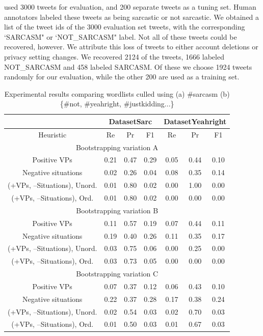 \documentclass[11pt]{article}
\begin{document}
\cite{riloff2013sarcasm} used 3000 tweets for evaluation, and 200 separate tweets as a tuning set. Human annotators labeled these tweets as being sarcastic or not sarcastic. We obtained a list of the tweet ids of the 3000 evaluation set tweets, with the corresponding `SARCASM" or `NOT\_SARCASM" label. Not all of these tweets could be recovered, however. We attribute this loss of tweets to either account deletions or privacy setting changes. We recovered 2124 of the tweets, 1666 labeled NOT\_SARCASM and 458 labeled SARCASM. Of these we choose 1924 tweets randomly for our evaluation, while the other 200 are used as a training set.

\begin{table}
\centering
\begin{tabular}{ | c | c c c | c c c |} 
\hline
  & \multicolumn{3}{|c|}{DatasetSarc} & \multicolumn{3}{|c|}{DatasetYeahright} \\
\hline
Heuristic & Re & Pr & F1 & Re & Pr & F1 \\
 \hline
 \multicolumn{7}{|c|}{Bootstrapping variation A} \\
 \hline
 Positive VPs & 0.21 & 0.47 & 0.29  & 0.05 & 0.44 & 0.10   \\ 
 Negative situations & 0.02 & 0.26 & 0.04  & 0.08 & 0.35 & 0.14 \\ 
 (+VPs, –Situations), Unord. & 0.01 & 0.80 & 0.02  & 0.00 & 1.00 & 0.00 \\ 
 (+VPs, –Situations), Ord. & 0.01 & 0.80 & 0.02 & 0.00 & 0.00 & 0.00  \\ 
 \hline
  \multicolumn{7}{|c|}{Bootstrapping variation B} \\
  \hline
 Positive VPs  & 0.11 & 0.57 & 0.19 & 0.07 & 0.44 & 0.11 \\ 
 Negative situations & 0.19 & 0.40 & 0.26 & 0.11 & 0.35 & 0.17 \\ 
 (+VPs, –Situations), Unord. & 0.03 & 0.75 & 0.06 & 0.00 & 0.25 & 0.00 \\ 
 (+VPs, –Situations), Ord.  & 0.03 & 0.73 & 0.05 & 0.00 & 0.00 & 0.00 \\ 
 \hline
  \multicolumn{7}{|c|}{Bootstrapping variation C} \\
  \hline
 Positive VPs & 0.07 & 0.37 & 0.12 & 0.06 & 0.43 & 0.10 \\ 
 Negative situations & 0.22 & 0.37 & 0.28 & 0.17 & 0.38 & 0.24 \\ 
 (+VPs, –Situations), Unord. & 0.02 & 0.54 & 0.03 & 0.02 & 0.70 & 0.03 \\ 
 (+VPs, –Situations), Ord.  & 0.01 & 0.50 & 0.03 & 0.01 & 0.67 & 0.03 \\ 
 \hline
\end{tabular}
\caption{Experimental results comparing wordlists culled using (a) \#sarcasm (b) \{\#not, \#yeahright, \#justkidding...\} }
\label{table:results}
\end{table}
\end{document}

